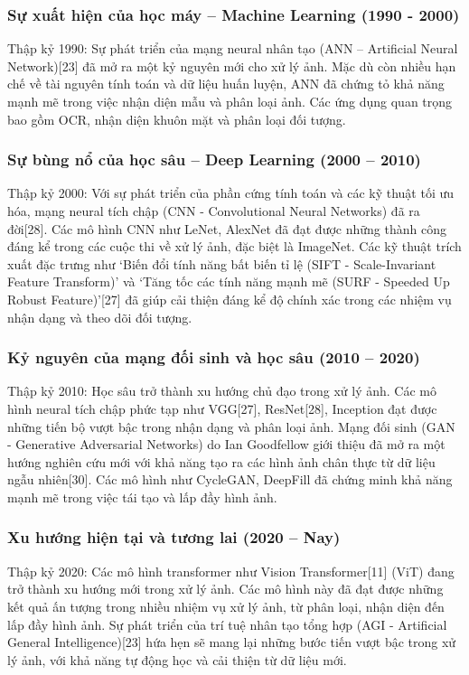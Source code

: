 \documentclass[12pt]{report}
\begin{document}
\subsubsection{Sự xuất hiện của học máy – Machine Learning (1990 - 2000)}
Thập kỷ 1990: Sự phát triển của mạng neural nhân tạo (ANN – Artificial Neural Network)[23] đã mở ra một kỷ nguyên mới cho xử lý ảnh. Mặc dù còn nhiều hạn chế về tài nguyên tính toán và dữ liệu huấn luyện, ANN đã chứng tỏ khả năng mạnh mẽ trong việc nhận diện mẫu và phân loại ảnh. Các ứng dụng quan trọng bao gồm OCR, nhận diện khuôn mặt và phân loại đối tượng.

\subsubsection{Sự bùng nổ của học sâu – Deep Learning (2000 – 2010)}
 Thập kỷ 2000: Với sự phát triển của phần cứng tính toán và các kỹ thuật tối ưu hóa, mạng neural tích chập (CNN - Convolutional Neural Networks) đã ra đời[28]. Các mô hình CNN như LeNet, AlexNet đã đạt được những thành công đáng kể trong các cuộc thi về xử lý ảnh, đặc biệt là ImageNet. Các kỹ thuật trích xuất đặc trưng như ‘Biến đổi tính năng bất biến tỉ lệ (SIFT - Scale-Invariant Feature Transform)’ và ‘Tăng tốc các tính năng mạnh mẽ (SURF - Speeded Up Robust Feature)’[27] đã giúp cải thiện đáng kể độ chính xác trong các nhiệm vụ nhận dạng và theo dõi đối tượng.

\subsubsection{Kỷ nguyên của mạng đối sinh và học sâu (2010 – 2020)}
Thập kỷ 2010: Học sâu trở thành xu hướng chủ đạo trong xử lý ảnh. Các mô hình neural tích chập phức tạp như VGG[27], ResNet[28], Inception đạt được những tiến bộ vượt bậc trong nhận dạng và phân loại ảnh. Mạng đối sinh (GAN - Generative Adversarial Networks) do Ian Goodfellow giới thiệu đã mở ra một hướng nghiên cứu mới với khả năng tạo ra các hình ảnh chân thực từ dữ liệu ngẫu nhiên[30]. Các mô hình như CycleGAN, DeepFill đã chứng minh khả năng mạnh mẽ trong việc tái tạo và lấp đầy hình ảnh.

\subsubsection{Xu hướng hiện tại và tương lai (2020 – Nay)}
Thập kỷ 2020: Các mô hình transformer như Vision Transformer[11] (ViT) đang trở thành xu hướng mới trong xử lý ảnh. Các mô hình này đã đạt được những kết quả ấn tượng trong nhiều nhiệm vụ xử lý ảnh, từ phân loại, nhận diện đến lấp đầy hình ảnh. Sự phát triển của trí tuệ nhân tạo tổng hợp (AGI - Artificial General Intelligence)[23] hứa hẹn sẽ mang lại những bước tiến vượt bậc trong xử lý ảnh, với khả năng tự động học và cải thiện từ dữ liệu mới.
\end{document}
